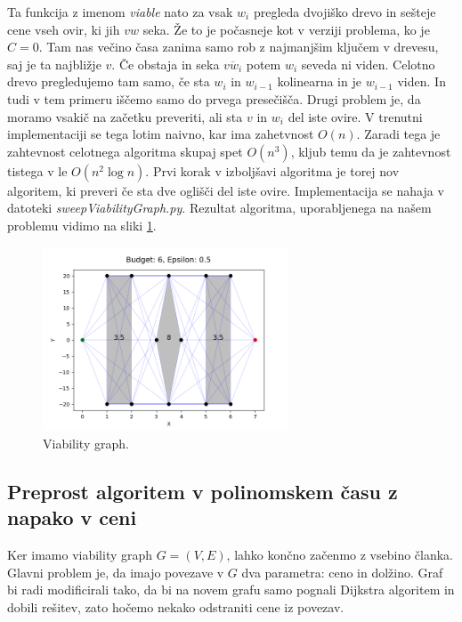 \documentclass{article}
\begin{document}
Ta funkcija z imenom \emph{viable} nato za vsak $w_i$ pregleda dvojiško drevo in sešteje cene vseh ovir, ki jih $vw$ seka. Že to je počasneje kot v verziji problema, ko je $C = 0$. Tam nas večino časa zanima samo rob z najmanjšim ključem v drevesu, saj je ta najbližje $v$. Če obstaja in seka $\overline{vw_i}$ potem $w_i$ seveda ni viden. Celotno drevo pregledujemo tam samo, če sta $w_i$ in $w_{i-1}$ kolinearna in je $w_{i-1}$ viden. In tudi v tem primeru iščemo samo do prvega presečišča. Drugi problem je, da moramo vsakič na začetku preveriti, ali sta $v$ in $w_i$ del iste ovire. V trenutni implementaciji se tega lotim naivno, kar ima zahetvnost $O(n)$. Zaradi tega je zahtevnost celotnega algoritma skupaj spet $O(n^3)$, kljub temu da je zahtevnost tistega v \cite{BCKO} le $O(n^2 \log n)$. Prvi korak v izboljšavi algoritma je torej nov algoritem, ki preveri če sta dve oglišči del iste ovire. Implementacija se nahaja v datoteki \emph{sweepViabilityGraph.py}. Rezultat algoritma, uporabljenega na našem problemu vidimo na sliki \ref{fig:errG1}.

\begin{figure}[ht]
    \centering
    \includegraphics[width=0.65\textwidth]{errGraph1.png}
    \caption{Viability graph.}
    \label{fig:errG1}
\end{figure}

 
\subsection*{Preprost algoritem v polinomskem času z napako v ceni}

Ker imamo viability graph $G = (V,E)$, lahko končno začenmo z vsebino članka. Glavni problem je, da imajo povezave v $G$ dva parametra: ceno in dolžino.
Graf bi radi modificirali tako, da bi na novem grafu samo pognali Dijkstra algoritem in dobili rešitev, zato hočemo nekako odstraniti cene iz povezav. 
\end{document}
